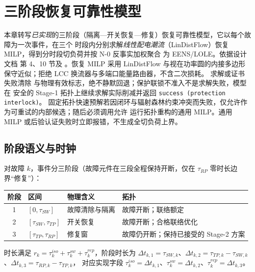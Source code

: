 
\section{三阶段恢复可靠性模型}\label{sec:rel-rs}

\begin{theorynote}
本章转写\emph{已实现}的三阶段（隔离—开关恢复—修复）恢复可靠性模型，它以每个故障为一次事件，在三个
时段内分别求解\emph{线性配电潮流}（LinDistFlow）恢复 MILP，得到分时段切负荷并按 N-0 反事实加权聚合
为 EENS/LOLE。依据设计文档
第 4、10 节及 。恢复 MILP 采用
LinDistFlow 与视在功率圆的内接多边形保守近似；拒绝 LCC 换流器与多端口能量路由器，不含二次损耗。
求解或证书失败清除  与物理有效标志，绝不静默回退；保护联锁不准入不是求解失败，模型在
安全的 Stage-1 拓扑上继续求解实际削减并返回 \texttt{success (protection interlock)}。
固定拓扑快速预解若因闭环与辐射森林约束冲突而失败，仅允许作为可重试的内部候选；随后必须调用允许
运行拓扑重构的通用 MILP。通用 MILP 或后验认证失败时立即报错，不生成全切负荷上界。
\end{theorynote}

\subsection{阶段语义与时钟}\label{sec:rel-rs-stage}
对故障 $k$，事件分三阶段（故障元件在三段全程保持开断，仅在 $\tau_{RP}$ 零时长边界“修复”）：
\begin{center}\footnotesize
\begin{tabular}{@{}cL{3.2cm}L{5.0cm}L{4.4cm}@{}}
\toprule
阶段 & 区间 & 物理含义 & 拓扑\\
 & $[0,\tau_{SW}]$ & 故障清除与隔离 & 故障开断；联络额定\\
2 & $[\tau_{SW},\tau_{TP}]$ & 开关恢复 & 故障开断；合格联络优化\\
3 & $[\tau_{TP},\tau_{RP}]$ & 修复窗 & 故障仍开断；保持已接受的 Stage-2 方案\\
\bottomrule
\end{tabular}
\end{center}
时长满足 $r_k=\tau_k^{iso}+\tau_k^{sw}+\tau_k^{rep}$，阶段时长为
$\Delta t_{k,1}=\tau_{SW,k}$、$\Delta t_{k,2}=\tau_{TP,k}-\tau_{SW,k}$、$\Delta t_{k,3}=\tau_{RP,k}-\tau_{TP,k}$，
对应实现字段 $\tau_k^{iso}=\Delta t_{k,1}$、$\tau_k^{sw}=\Delta t_{k,2}$、$\tau_k^{rep}=\Delta t_{k,3}$。

